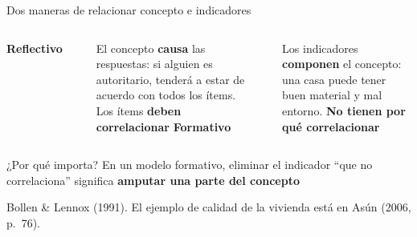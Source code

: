 \documentclass[aspectratio=169,11pt]{beamer}
\newcommand{\hlr}[1]{\textcolor{acero}{\textbf{#1}}}        %
\newcommand{\fuente}[1]{\par\vfill{\scriptsize\color{gris}#1\par}}
\begin{document}
\begin{frame}{Dos maneras de relacionar concepto e indicadores}
\begin{columns}[T]
\centering\textbf{Reflectivo}\\[0.2cm]
\\[0.2cm]
\raggedright\footnotesize
El concepto \textbf{causa} las respuestas: si alguien es autoritario, tenderá a estar de acuerdo con todos los ítems. Los ítems \textbf{deben correlacionar}
\centering\textbf{Formativo}\\[0.2cm]
\\[0.2cm]
\raggedright\footnotesize
Los indicadores \textbf{componen} el concepto: una casa puede tener buen material y mal entorno. \textbf{No tienen por qué correlacionar}
\end{columns}
\bigskip
\begin{alertblock}{¿Por qué importa?}
\small
En un modelo formativo, eliminar el indicador ``que no correlaciona'' significa \hlr{amputar una parte del concepto}
\end{alertblock}
\fuente{Bollen \& Lennox (1991). El ejemplo de calidad de la vivienda está en Asún (2006, p.~76).}
\end{frame}
\end{document}
